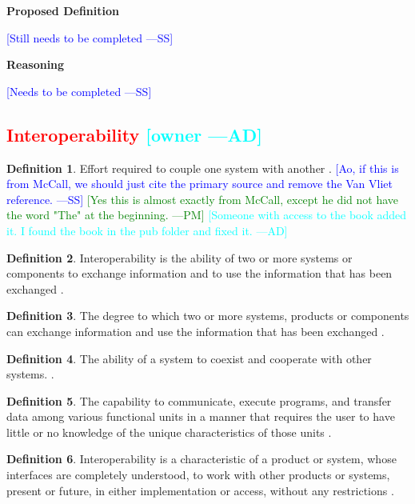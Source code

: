 \documentclass[letterpaper,cleveref]{lipics-v2019}
\newcommand{\authornote}[3]{\textcolor{#1}{[#3 ---#2]}}
\newcommand{\authornote}[3]{}
\newcommand{\wss}[1]{\authornote{blue}{SS}{#1}} %
\newcommand{\pmi}[1]{\authornote{green}{PM}{#1}} %
\newcommand{\ad}[1]{\authornote{cyan}{AD}{#1}} %
\newcommand{\notdone}[1]{\textcolor{red}{#1}}
\theoremstyle{definition}
\newtheorem{defn}{Definition}
\begin{document}
\noindent \textbf{Proposed Definition}

\wss{Still needs to be completed}

\noindent \textbf{Reasoning}

\wss{Needs to be completed}

\subsection{\notdone{Interoperability} \ad{owner}}

\begin{defn}
  Effort required to couple one system with another
  \citep{McCallEtAl1977}. \wss{Ao, if
    this is from McCall, we should just cite the primary source and remove the
    Van Vliet reference.} \pmi{Yes this is almost exactly from McCall, except he did not have the word "The" at the beginning.}
    \ad{Someone with access to the book added it. I found the book in the pub
    folder and fixed it.}
\end{defn}

\begin{defn}
  Interoperability is the ability of two or more systems or components to
  exchange information and to use the information that has been exchanged
  \citep{IEEEComputerDictionary1991}.
\end{defn}

\begin{defn}
  \label{InteroperabilitySelected}
  The degree to which two or more systems, products or components can exchange
  information and use the information that has been exchanged
  \citep{ISO/IEC25010}.
\end{defn}

\begin{defn}
  The ability of a system to coexist and cooperate with other systems.
  \citep{ghezzi1991fundamentals}.
\end{defn}

\begin{defn}
  The capability to communicate, execute programs, and transfer data among
  various functional units in a manner that requires the user to have little or
  no knowledge of the unique characteristics of those units
  \citep{ISO/IEC/IEEE24765}.
\end{defn}

\begin{defn}
  Interoperability is a characteristic of a product or system, whose interfaces
  are completely understood, to work with other products or systems, present or
  future, in either implementation or access, without any restrictions
  \citep{AFUL2019}.
\end{defn}
\end{document}
